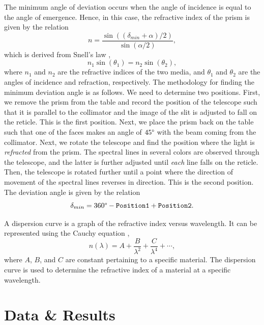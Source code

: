 \documentclass[10pt]{article}
\begin{document}
The minimum angle of deviation occurs when the angle of incidence is equal to the angle of emergence. Hence, in this case, the refractive index of the prism is given by the relation
\begin{equation}
    \label{eq:1}
    n = \frac{\sin\left((\delta_{min}+\alpha) / 2 \right)}{\sin\left(\alpha / 2\right)},
\end{equation}
which is derived from Snell's law \cite{Hecht_2017},
\begin{equation}
    n_1 \sin(\theta_1) = n_2 \sin(\theta_2),
\end{equation}
where $n_1$ and $n_2$ are the refractive indices of the two media, and $\theta_1$ and $\theta_2$ are the angles of incidence and refraction, respectively. The methodology for finding the minimum deviation angle is as follows. We need to determine two positions. First, we remove the prism from the table and record the position of the telescope such that it is parallel to the collimator and the image of the slit is adjusted to fall on the reticle. This is the first position. Next, we place the prism back on the table such that one of the faces makes an angle of $45\degree$ with the beam coming from the collimator. Next, we rotate the telescope and find the position where the light is \textit{refracted} from the prism. The spectral lines in several colors are observed through the telescope, and the latter is further adjusted until \textit{each} line falls on the reticle. Then, the telescope is rotated further until a point where the direction of movement of the spectral lines reverses in direction. This is the second position. The deviation angle is given by the relation
\begin{equation}
    \delta_{min} = 360\degree - \texttt{Position1} + \texttt{Position2}.
\end{equation}

A dispersion curve is a graph of the refractive index versus wavelength. It can be represented using the Cauchy equation \cite{Pedrotti_2013},
\begin{equation}
    n(\lambda) = A + \frac{B}{\lambda^2} + \frac{C}{\lambda^4} + \cdots,
\end{equation}
where $A$, $B$, and $C$ are constant pertaining to a specific material. The dispersion curve is used to determine the refractive index of a material at a specific wavelength.

\section{Data \& Results}
\end{document}
